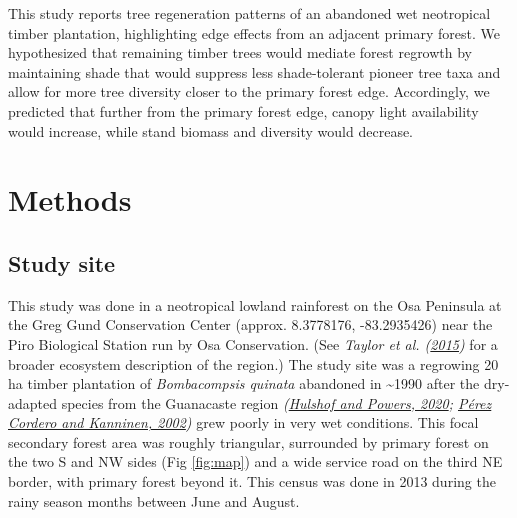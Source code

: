 \documentclass[
  12pt,
]{article}
\begin{document}
This study reports tree regeneration patterns of an abandoned wet neotropical timber plantation, highlighting edge effects from an adjacent primary forest.
We hypothesized that remaining timber trees would mediate forest regrowth by maintaining shade that would suppress less shade-tolerant pioneer tree taxa and allow for more tree diversity closer to the primary forest edge.
Accordingly, we predicted that further from the primary forest edge, canopy light availability would increase, while stand biomass and diversity would decrease.

\hypertarget{methods}{%
\section{Methods}\label{methods}}

\hypertarget{study-site}{%
\subsection{Study site}\label{study-site}}

This study was done in a neotropical lowland rainforest on the Osa Peninsula at the Greg Gund Conservation Center (approx. 8.3778176, -83.2935426) near the Piro Biological Station run by Osa Conservation.
(See \emph{Taylor et al. (\protect\hyperlink{ref-taylor15}{2015})} for a broader ecosystem description of the region.)
The study site was a regrowing 20 ha timber plantation of \emph{Bombacompsis quinata} abandoned in \textasciitilde1990 after the dry-adapted species from the Guanacaste region \emph{(\protect\hyperlink{ref-hulshof20}{Hulshof and Powers, 2020}; \protect\hyperlink{ref-perezcordero02}{Pérez Cordero and Kanninen, 2002})} grew poorly in very wet conditions.
This focal secondary forest area was roughly triangular, surrounded by primary forest on the two S and NW sides (Fig \ref{fig:map}) and a wide service road on the third NE border, with primary forest beyond it.
This census was done in 2013 during the rainy season months between June and August.
\end{document}
